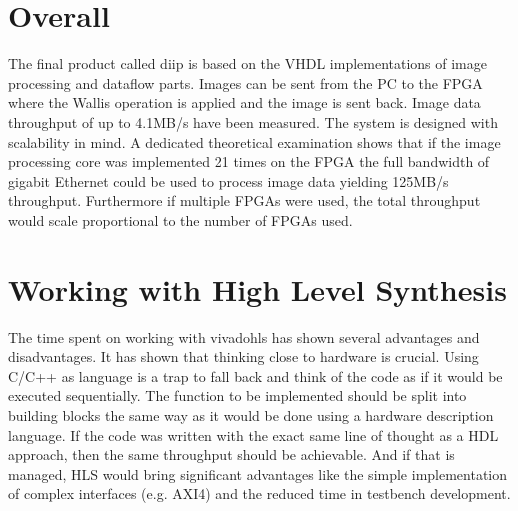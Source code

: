%
%
\section{Overall}
The final product called \gls{diip} is based on the VHDL implementations of
image processing and dataflow parts. Images can be sent from the PC to the FPGA
where
the Wallis operation is applied and the image is sent back. Image data
throughput of up to 4.1MB/s have been measured. The system is designed with
scalability in mind. A dedicated theoretical examination shows that if the
image processing core was implemented 21 times on the FPGA the full bandwidth of
gigabit Ethernet could be used to process image data yielding 125MB/s
throughput. Furthermore if multiple FPGAs were used, the total throughput would
scale proportional to the number of FPGAs used.

%
%
\section{Working with High Level Synthesis}
The time spent on working with \gls{vivadohls} has shown several advantages and
disadvantages. It has shown that thinking close to hardware is crucial. Using
C/C++ as language is a trap to fall back and think of the code as if it would be
executed sequentially. The function to be implemented should be split into
building blocks the same way as it would be done using a hardware description
language. If the code was written with the exact same line of thought as a HDL
approach, then the same throughput should be achievable. And if that is managed,
HLS would bring significant advantages like the simple implementation of complex
interfaces (e.g. AXI4) and the reduced time in testbench development.

%
%
